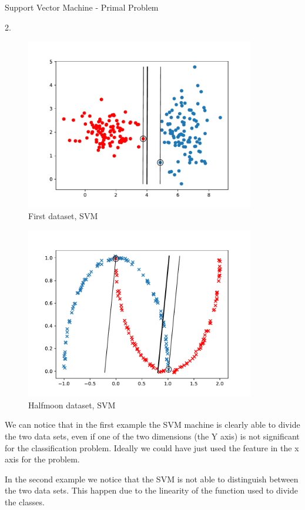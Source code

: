 \documentclass[english]{exercisesheet}
\begin{document}
 \cleardoublepage
 \begin{nexercise}{Support Vector Machine - Primal Problem}
 \begin{solution} 2.
        \begin{figure}
        \centering
        \includegraphics[width=10cm]{simple-line.pdf}
        \caption{First dataset, SVM}
        \end{figure}
        \begin{figure}
        \centering
        \cleardoublepage
        \includegraphics[width=10cm]{moon-line.pdf}
        \caption{Halfmoon dataset, SVM}
        \end{figure}
    \end{solution}
 
 We can notice that in the first example the SVM machine is clearly able to divide the two data sets, even if one of the two dimensions (the Y axis) is not significant for the classification problem. Ideally we could have just used the feature in the x axis for the problem.
 
 In the second example we notice that the SVM is not able to distinguish between the two data sets. This happen due to the linearity of the function used to divide the classes.
 
 \end{nexercise}
 
\end{document}
